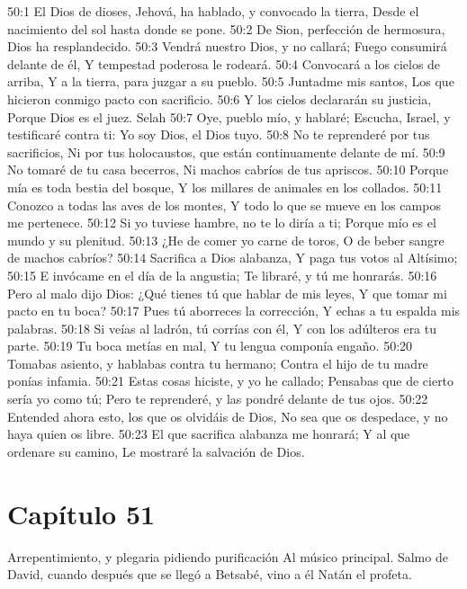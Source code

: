 50:1 El Dios de dioses, Jehová, ha hablado, y convocado la tierra, 
Desde el nacimiento del sol hasta donde se pone. 
50:2 De Sion, perfección de hermosura, 
Dios ha resplandecido. 
50:3 Vendrá nuestro Dios, y no callará; 
Fuego consumirá delante de él, 
Y tempestad poderosa le rodeará. 
50:4 Convocará a los cielos de arriba, 
Y a la tierra, para juzgar a su pueblo. 
50:5 Juntadme mis santos, 
Los que hicieron conmigo pacto con sacrificio. 
50:6 Y los cielos declararán su justicia, 
Porque Dios es el juez. Selah 
50:7 Oye, pueblo mío, y hablaré; 
Escucha, Israel, y testificaré contra ti: 
Yo soy Dios, el Dios tuyo. 
50:8 No te reprenderé por tus sacrificios, 
Ni por tus holocaustos, que están continuamente delante de mí. 
50:9 No tomaré de tu casa becerros, 
Ni machos cabríos de tus apriscos. 
50:10 Porque mía es toda bestia del bosque, 
Y los millares de animales en los collados. 
50:11 Conozco a todas las aves de los montes, 
Y todo lo que se mueve en los campos me pertenece. 
50:12 Si yo tuviese hambre, no te lo diría a ti; 
Porque mío es el mundo y su plenitud. 
50:13 ¿He de comer yo carne de toros, 
O de beber sangre de machos cabríos? 
50:14 Sacrifica a Dios alabanza, 
Y paga tus votos al Altísimo; 
50:15 E invócame en el día de la angustia; 
Te libraré, y tú me honrarás. 
50:16 Pero al malo dijo Dios: 
¿Qué tienes tú que hablar de mis leyes, 
Y que tomar mi pacto en tu boca? 
50:17 Pues tú aborreces la corrección, 
Y echas a tu espalda mis palabras. 
50:18 Si veías al ladrón, tú corrías con él, 
Y con los adúlteros era tu parte. 
50:19 Tu boca metías en mal, 
Y tu lengua componía engaño. 
50:20 Tomabas asiento, y hablabas contra tu hermano; 
Contra el hijo de tu madre ponías infamia. 
50:21 Estas cosas hiciste, y yo he callado; 
Pensabas que de cierto sería yo como tú; 
Pero te reprenderé, y las pondré delante de tus ojos. 
50:22 Entended ahora esto, los que os olvidáis de Dios, 
No sea que os despedace, y no haya quien os libre. 
50:23 El que sacrifica alabanza me honrará; 
Y al que ordenare su camino, 
Le mostraré la salvación de Dios. 
\section*{Capítulo 51}
Arrepentimiento, y plegaria pidiendo purificación 
Al músico principal. Salmo de David, cuando después que se llegó a Betsabé, vino a él Natán el profeta. 
 
